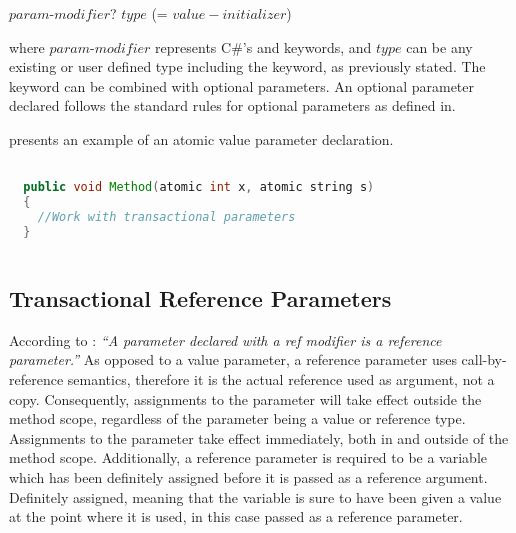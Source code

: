  $param$-$modifier$? $type$  (= $value-initializer$)

where $param$-$modifier$ represents C\#'s  and  keywords, and $type$ can be any existing or user defined type including the  keyword, as previously stated. The  keyword can be combined with optional parameters. An optional parameter declared  follows the standard rules for optional parameters as defined in\cite[p. 46-47]{sestoft2011c}.

 presents an example of an atomic value parameter declaration.

\begin{lstlisting}[label=lst:design_value_parameter,
 caption={Transactional Value Parameter},
 language=Java, 
 showspaces=false,
 showtabs=false,
 breaklines=true,
 showstringspaces=false,
 breakatwhitespace=true,
 commentstyle=\color{greencomments},
 keywordstyle=\color{bluekeywords},
 stringstyle=\color{redstrings},
 morekeywords={atomic, retry, orElse, var, get, set, string}]  % Start your code-block

  public void Method(atomic int x, atomic string s)
  {
    //Work with transactional parameters
  }
  
\end{lstlisting}

\subsection{Transactional Reference Parameters}
\label{subsec:stm_desgin_ref_parameters}
According to \cite[p. 97]{csharp2013specificaiton}: \textit{``A parameter declared with a ref modifier is a reference parameter.''} As opposed to a value parameter, a reference parameter uses call-by-reference semantics, therefore it is the actual reference used as argument, not a copy. Consequently, assignments to the parameter will take effect outside the method scope, regardless of the parameter being a value or reference type. Assignments to the parameter take effect immediately, both in and outside of the method scope\cite[p. 42]{sestoft2011c}. Additionally, a reference parameter is required to be a variable which has been definitely assigned before it is passed as a reference argument\cite[p. 97]{csharp2013specificaiton}. Definitely assigned, meaning that the variable is sure to have been given a value at the point where it is used\cite[p. 96]{csharp2013specificaiton}, in this case passed as a reference parameter.

